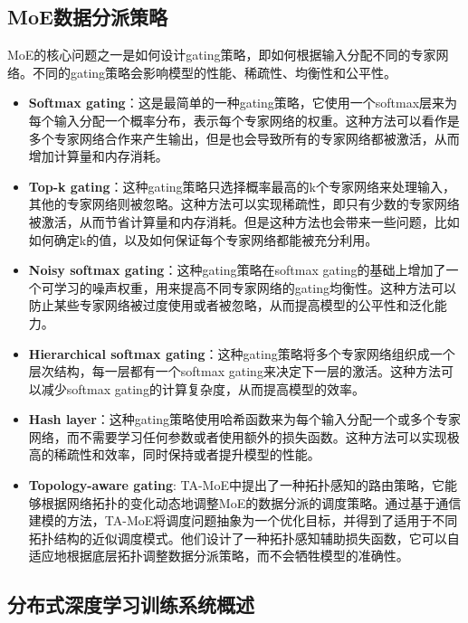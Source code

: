 \subsection{MoE数据分派策略}
MoE的核心问题之一是如何设计gating策略，即如何根据输入分配不同的专家网络。不同的gating策略会影响模型的性能、稀疏性、均衡性和公平性。
\begin{itemize}
    \item \textbf{Softmax gating}：这是最简单的一种gating策略，它使用一个softmax层来为每个输入分配一个概率分布，表示每个专家网络的权重。这种方法可以看作是多个专家网络合作来产生输出，但是也会导致所有的专家网络都被激活，从而增加计算量和内存消耗。
    \item \textbf{Top-k gating}：这种gating策略只选择概率最高的k个专家网络来处理输入，其他的专家网络则被忽略。这种方法可以实现稀疏性，即只有少数的专家网络被激活，从而节省计算量和内存消耗。但是这种方法也会带来一些问题，比如如何确定k的值，以及如何保证每个专家网络都能被充分利用。
    \item \textbf{Noisy softmax gating}：这种gating策略在softmax gating的基础上增加了一个可学习的噪声权重，用来提高不同专家网络的gating均衡性。这种方法可以防止某些专家网络被过度使用或者被忽略，从而提高模型的公平性和泛化能力。
    \item \textbf{Hierarchical softmax gating}：这种gating策略将多个专家网络组织成一个层次结构，每一层都有一个softmax gating来决定下一层的激活。这种方法可以减少softmax gating的计算复杂度，从而提高模型的效率。
    \item \textbf{Hash layer}：这种gating策略使用哈希函数来为每个输入分配一个或多个专家网络，而不需要学习任何参数或者使用额外的损失函数。这种方法可以实现极高的稀疏性和效率，同时保持或者提升模型的性能。
    \item \textbf{Topology-aware gating}: TA-MoE中提出了一种拓扑感知的路由策略，它能够根据网络拓扑的变化动态地调整MoE的数据分派的调度策略。通过基于通信建模的方法，TA-MoE将调度问题抽象为一个优化目标，并得到了适用于不同拓扑结构的近似调度模式。他们设计了一种拓扑感知辅助损失函数，它可以自适应地根据底层拓扑调整数据分派策略，而不会牺牲模型的准确性。
\end{itemize}

\subsection{分布式深度学习训练系统概述}

